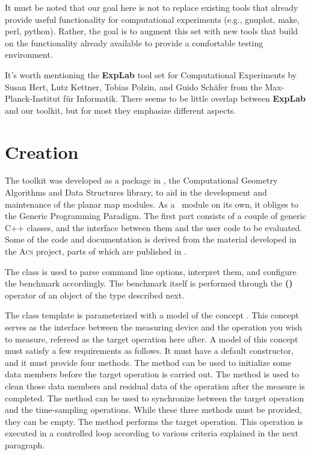 It must be noted that our goal here is not to replace existing tools
that already provide useful functionality for computational
experiments (e.g., gnuplot, make, perl, python). Rather, the goal is
to augment this set with new tools that build on the functionality
already available to provide a comfortable testing environment.

It's worth mentioning the \textbf{ExpLab} tool set for Computational
Experiments by Susan Hert, Lutz Kettner, Tobias Polzin, and Guido
Sch{\"a}fer from the Max-Planck-Institut f{\"u}r Informatik. There seems to be
little overlap between \textbf{ExpLab} and our toolkit, but for most
they emphasize different aspects.

\section{Creation}
The toolkit was developed as a package in \cgal, the Computational
Geometry Algorithms and Data Structures library, to aid in the
development and maintenance of the planar map modules. As a 
\cgal\ module on its own, it obliges to the Generic Programming Paradigm. 
The first part consists of a couple of generic C++ classes, and the
interface between them and the user code to be evaluated. Some of the code 
and documentation is derived from the material developed in the 
\textsc{Acs} project, parts of which are published in \cite{cgal:f-ecsca-04}.

The  class is used to parse command line options, 
interpret them, and configure the benchmark accordingly. The benchmark
itself is performed through the \textbf{()} operator of an object of the
type  described next.

The  class template is parameterized with a model of the
concept . This concept serves as the interface between
the measuring device and the operation you wish to measure, refereed
as the target operation here after. A model of this concept must
satisfy a few requirements as follows. It must have a default
constructor, and it must provide four methods. The
 method can be used to initialize some data
members before the target operation is carried out. The
 method is used to clean those data members
and residual data of the operation after the measure is completed. The
 method can be used to synchronize between the
target operation and the time-sampling operations. While these three
methods must be provided, they can be empty. The 
method performs the target operation. This operation is executed in a
controlled loop according to various criteria explained in the next
paragraph.

